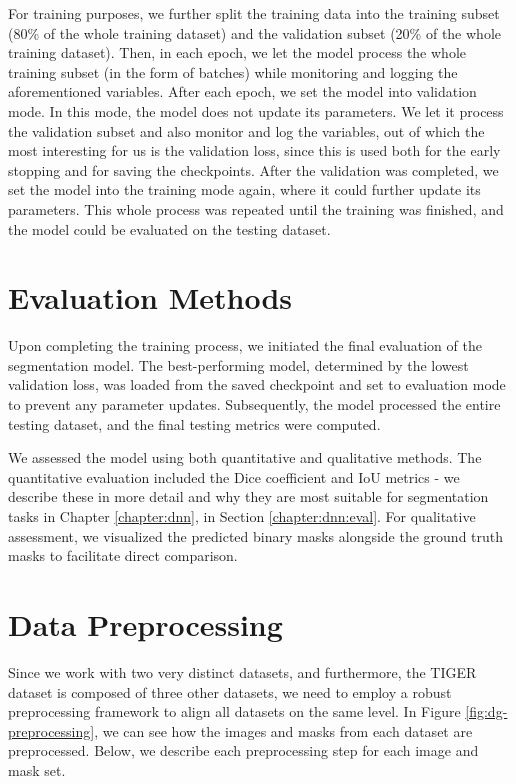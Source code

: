 For training purposes, we further split the training data into the training subset (80\% of the whole training dataset) and the validation subset (20\% of the whole training dataset). Then, in each epoch, we let the model process the whole training subset (in the form of batches) while monitoring and logging the aforementioned variables. After each epoch, we set the model into validation mode. In this mode, the model does not update its parameters. We let it process the validation subset and also monitor and log the variables, out of which the most interesting for us is the validation loss, since this is used both for the early stopping and for saving the checkpoints. After the validation was completed, we set the model into the training mode again, where it could further update its parameters. This whole process was repeated until the training was finished, and the model could be evaluated on the testing dataset.

\section{Evaluation Methods}
Upon completing the training process, we initiated the final evaluation of the segmentation model. The best-performing model, determined by the lowest validation loss, was loaded from the saved checkpoint and set to evaluation mode to prevent any parameter updates. Subsequently, the model processed the entire testing dataset, and the final testing metrics were computed.

We assessed the model using both quantitative and qualitative methods. The quantitative evaluation included the Dice coefficient and IoU metrics - we describe these in more detail and why they are most suitable for segmentation tasks in Chapter \ref{chapter:dnn}, in Section \ref{chapter:dnn:eval}. For qualitative assessment, we visualized the predicted binary masks alongside the ground truth masks to facilitate direct comparison.

\section{Data Preprocessing}
Since we work with two very distinct datasets, and furthermore, the TIGER dataset is composed of three other datasets, we need to employ a robust preprocessing framework to align all datasets on the same level. In Figure \ref{fig:dg-preprocessing}, we can see how the images and masks from each dataset are preprocessed. Below, we describe each preprocessing step for each image and mask set.

